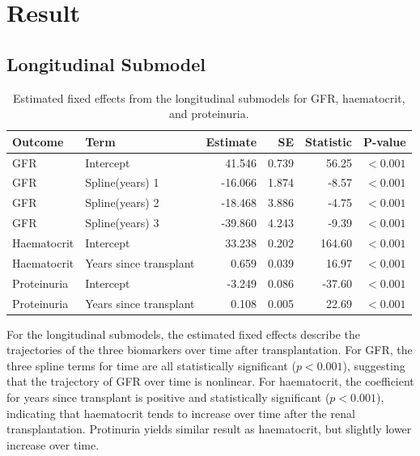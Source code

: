 \documentclass[11pt]{article}
\begin{document}
\section{Result}
\FloatBarrier

\subsection*{Longitudinal Submodel}

\begin{table}[ht]
\centering
\renewcommand{\arraystretch}{1.25}
\setlength{\tabcolsep}{10pt}
\begin{tabular}{llrrrr}
\toprule
Outcome & Term & Estimate & SE & Statistic & P-value \\
\midrule
GFR & Intercept & 41.546 & 0.739 & 56.25 & $<0.001$ \\
GFR & Spline(years) 1 & -16.066 & 1.874 & -8.57 & $<0.001$ \\
GFR & Spline(years) 2 & -18.468 & 3.886 & -4.75 & $<0.001$ \\
GFR & Spline(years) 3 & -39.860 & 4.243 & -9.39 & $<0.001$ \\
Haematocrit & Intercept & 33.238 & 0.202 & 164.60 & $<0.001$ \\
Haematocrit & Years since transplant & 0.659 & 0.039 & 16.97 & $<0.001$ \\
Proteinuria & Intercept & -3.249 & 0.086 & -37.60 & $<0.001$ \\
Proteinuria & Years since transplant & 0.108 & 0.005 & 22.69 & $<0.001$ \\
\bottomrule
\end{tabular}
\caption{Estimated fixed effects from the longitudinal submodels for GFR, haematocrit, and proteinuria.}
\label{tab:longitudinal}
\end{table}

For the longitudinal submodels, the estimated fixed effects describe the trajectories of the three biomarkers over time after transplantation. For GFR, the three spline terms for time are all statistically significant ($p<0.001$), suggesting that the trajectory of GFR over time is nonlinear. For haematocrit, the coefficient for years since transplant is positive and statistically significant ($p<0.001$), indicating that haematocrit tends to increase over time after the renal transplantation. Protinuria yields similar result as haematocrit, but slightly lower increase over time.

\FloatBarrier
\end{document}
